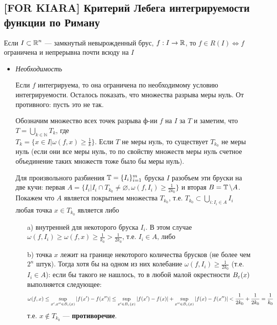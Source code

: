 \documentclass[a4paper]{article}
\begin{document}
\subsection{[FOR KIARA] Критерий Лебега интегрируемости функции по Риману}
\theorem Если $I\subset \operatorname{\mathbb{R}}^n$ — замкнутый невырожденный брус, $f: I\to\operatorname{\mathbb{R}}$, то $f\in R(I) \iff f$ ограничена и непрерывна почти всюду на $I$

\proof 
\begin{itemize}
    \item \textit{Необходимость}
    
     Если $f$ интегрируема, то она ограничена по необходимому условию интегрируемости. Осталось показать, что множества разрыва меры нуль. От противного: пусть это не так.

    Обозначим множество всех точек разрыва ф-ии $f$ на $I$ за $T$ и заметим, что $T = \displaystyle\bigcup_{k\in\mathbb{N}}T_k$, где\\
    $T_k = \{x\in I | \omega(f, x) \ge \frac{1}{k}\}$. Если $T$ не меры нуль, то существует $T_{k_0}$ не меры нуль (если они все меры нуль, то по свойству множеств меры нуль счетное объединение таких множеств тоже было бы меры нуль).

    Для произвольного разбиения $\operatorname{\mathbb{T}} = \{I_i\}_{i=1}^m$ бруска $I$ разобъем эти бруски на две кучи: первая $A = \{I_i | I_i\cap T_{k_0} \ne \varnothing, \omega(f, I_i) \ge \frac{1}{2k_0}\}$ и вторая $B = \operatorname{\mathbb{T}}\backslash A$. Покажем что $A$ является покрытием множества $T_{k_0}$, т.е. $T_{k_0} \subset \displaystyle\bigcup_{i: I_i\in A} I_i$ любая точка $x\in T_{k_0}$ является либо
    \begin{itemize}
        \item[a)] внутренней для некоторого бруска $I_i$. В этом случае $\omega(f, I_i) \ge \omega(f, x) \ge \frac{1}{k_0} > \frac{1}{2k_0}$, т.е. $I_i \in A$, либо
        \item[b)] точка $x$ лежит на границе некоторого количества брусков (не более чем $2^n$ штук). Тогда хотя бы на одном из них колебание $\omega(f, I_i) \ge \frac{1}{2k_0}$ (т.е. $I_i \in A$): если бы такого не нашлось, то в любой малой окрестности $B_{\operatorname{\varepsilon}}(x)$ выполняется следующее:
        \begin{equation*}
            \omega(f, x) \le \sup_{x', x''\in B_{\operatorname{\varepsilon}}(x)} |f(x')-f(x'')| \le \sup_{x'\in B_{\operatorname{\varepsilon}}(x)}|f(x')-f(x)| + \sup_{x''\in B_{\operatorname{\varepsilon}}(x)}|f(x)-f(x'')| < \frac{1}{2k_0} + \frac{1}{2k_0} = \frac{1}{k_0}
        \end{equation*}
        т.е. $x\not\in T_{k_0}$ --- \textbf{противоречие}.
    \end{itemize}


\end{itemize}
\end{document}
